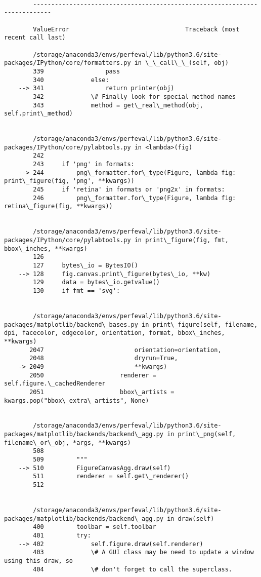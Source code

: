 \documentclass[11pt]{article}
\begin{document}
    \begin{Verbatim}[commandchars=\\\{\}]

        ---------------------------------------------------------------------------

        ValueError                                Traceback (most recent call last)

        /storage/anaconda3/envs/perfeval/lib/python3.6/site-packages/IPython/core/formatters.py in \_\_call\_\_(self, obj)
        339                 pass
        340             else:
    --> 341                 return printer(obj)
        342             \# Finally look for special method names
        343             method = get\_real\_method(obj, self.print\_method)


        /storage/anaconda3/envs/perfeval/lib/python3.6/site-packages/IPython/core/pylabtools.py in <lambda>(fig)
        242 
        243     if 'png' in formats:
    --> 244         png\_formatter.for\_type(Figure, lambda fig: print\_figure(fig, 'png', **kwargs))
        245     if 'retina' in formats or 'png2x' in formats:
        246         png\_formatter.for\_type(Figure, lambda fig: retina\_figure(fig, **kwargs))


        /storage/anaconda3/envs/perfeval/lib/python3.6/site-packages/IPython/core/pylabtools.py in print\_figure(fig, fmt, bbox\_inches, **kwargs)
        126 
        127     bytes\_io = BytesIO()
    --> 128     fig.canvas.print\_figure(bytes\_io, **kw)
        129     data = bytes\_io.getvalue()
        130     if fmt == 'svg':


        /storage/anaconda3/envs/perfeval/lib/python3.6/site-packages/matplotlib/backend\_bases.py in print\_figure(self, filename, dpi, facecolor, edgecolor, orientation, format, bbox\_inches, **kwargs)
       2047                         orientation=orientation,
       2048                         dryrun=True,
    -> 2049                         **kwargs)
       2050                     renderer = self.figure.\_cachedRenderer
       2051                     bbox\_artists = kwargs.pop("bbox\_extra\_artists", None)


        /storage/anaconda3/envs/perfeval/lib/python3.6/site-packages/matplotlib/backends/backend\_agg.py in print\_png(self, filename\_or\_obj, *args, **kwargs)
        508 
        509         """
    --> 510         FigureCanvasAgg.draw(self)
        511         renderer = self.get\_renderer()
        512 


        /storage/anaconda3/envs/perfeval/lib/python3.6/site-packages/matplotlib/backends/backend\_agg.py in draw(self)
        400         toolbar = self.toolbar
        401         try:
    --> 402             self.figure.draw(self.renderer)
        403             \# A GUI class may be need to update a window using this draw, so
        404             \# don't forget to call the superclass.



\end{Verbatim}
\end{document}
